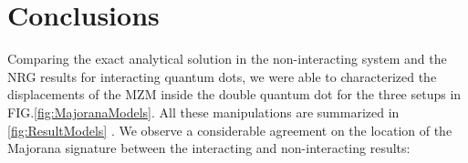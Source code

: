 















\chapter{Conclusions}
Comparing the exact analytical solution in the non-interacting system and the NRG results for interacting quantum dots, we were able to characterized the displacements of the MZM inside the double quantum dot for the three setups in FIG.\ref{fig:MajoranaModels}. All these manipulations are summarized in \ref{fig:ResultModels} . We observe a considerable agreement on the location of the Majorana signature between the interacting and non-interacting results:

